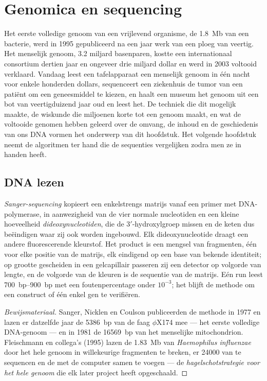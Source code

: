 \chapter{Genomica en sequencing}\label{ch:b3:genomics}

Het eerste volledige genoom van een vrijlevend organisme, de
\qty{1.8}{Mb} van een bacterie, werd in 1995 gepubliceerd na een jaar
werk van een ploeg van veertig. Het menselijk genoom, \num{3.2} miljard
basenparen, kostte een internationaal consortium dertien jaar en
ongeveer drie miljard dollar en werd in 2003 voltooid verklaard.
Vandaag leest een tafelapparaat een menselijk genoom in één nacht voor
enkele honderden dollars, sequenceert een ziekenhuis de tumor van een
patiënt om een geneesmiddel te kiezen, en haalt een museum het genoom
uit een bot van veertigduizend jaar oud en leest het. De techniek die
dit mogelijk maakte, de wiskunde die miljoenen korte  tot een
genoom maakt, en wat de voltooide genomen hebben geleerd over de
omvang, de inhoud en de geschiedenis van ons DNA vormen het onderwerp
van dit hoofdstuk. Het volgende hoofdstuk neemt de algoritmen ter hand
die de sequenties vergelijken zodra men ze in handen heeft.

\section{DNA lezen}

\begin{definition}\label{def:b3:genomics:sanger}
\emph{Sanger-sequencing} kopieert een enkelstrengs matrijs vanaf een
primer met DNA-polymerase, in aanwezigheid van de vier normale
nucleotiden en een kleine hoeveelheid \emph{dideoxynucleotiden}, die de
3$'$-hydroxylgroep missen en de keten dus beëindigen waar zij ook
worden ingebouwd. Elk dideoxynucleotide draagt een andere
fluorescerende kleurstof. Het product is een mengsel van fragmenten,
één voor elke positie van de matrijs, elk eindigend op een base van
bekende identiteit; op grootte gescheiden in een gelcapillair passeren
zij een detector op volgorde van lengte, en de volgorde van de kleuren
is de sequentie van de matrijs. Eén run leest \qtyrange{700}{900}{bp}
met een foutenpercentage onder $10^{-3}$; het blijft de methode om een
construct of één enkel gen te verifiëren.
\end{definition}

\begin{proof}[Bewijsmateriaal]
Sanger, Nicklen en Coulson publiceerden de methode in 1977 en lazen er
datzelfde jaar de \qty{5386}{bp} van de faag $\phi$X174 mee --- het
eerste volledige DNA-genoom --- en in 1981 de \qty{16569}{bp} van het
menselijke mitochondrion. Fleischmann en collega's (1995) lazen de
\qty{1.83}{Mb} van \emph{Haemophilus influenzae} door het hele genoom
in willekeurige fragmenten te breken, er \num{24000} van te sequencen
en de  met de computer samen te voegen --- de
\emph{hagelschotstrategie voor het hele genoom} die elk later project
heeft opgeschaald.
\end{proof}

